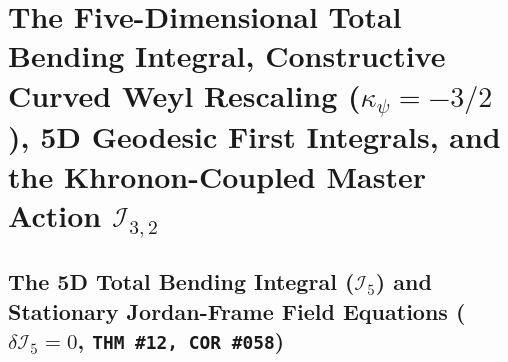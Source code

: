 \documentclass[11pt,a4paper]{article}
\newcommand{\catD}{\text{\textbf{\textcolor{blue!75!black}{[D]}}}}
\theoremstyle{definition}
\theoremstyle{plain}
\theoremstyle{remark}
\begin{document}

\section{\texorpdfstring{The Five-Dimensional Total Bending Integral, Constructive Curved Weyl Rescaling ($\kappa_\psi = -3/2$), 5D Geodesic First Integrals, and the Khronon-Coupled Master Action $\mathcal{I}_{3,2}$ \catD}{The Five-Dimensional Total Bending Integral, Constructive Curved Weyl Rescaling, 5D Geodesic First Integrals, and the Khronon-Coupled Master Action}}
\label{sec:c3_master_action}

\subsection{\texorpdfstring{The 5D Total Bending Integral ($\mathcal{I}_5$) and Stationary Jordan-Frame Field Equations ($\delta\mathcal{I}_5 = 0$, \texttt{THM~\#12, COR~\#058})}{The 5D Total Bending Integral and Stationary Jordan-Frame Field Equations}}
\end{document}

